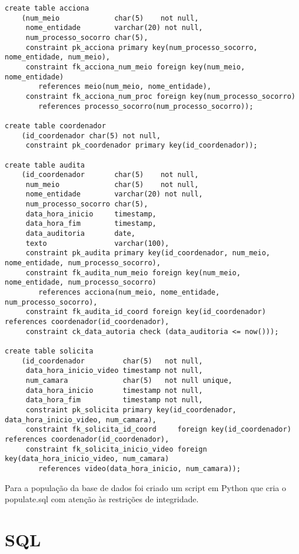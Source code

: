\documentclass[10pt,a4paper]{article}
\begin{document}
\begin{verbatim}
create table acciona
    (num_meio             char(5)    not null,
     nome_entidade        varchar(20) not null,
     num_processo_socorro char(5),
     constraint pk_acciona primary key(num_processo_socorro, nome_entidade, num_meio),
     constraint fk_acciona_num_meio foreign key(num_meio, nome_entidade)
        references meio(num_meio, nome_entidade),
     constraint fk_acciona_num_proc foreign key(num_processo_socorro) 
        references processo_socorro(num_processo_socorro));

create table coordenador
    (id_coordenador char(5) not null,
     constraint pk_coordenador primary key(id_coordenador));

create table audita
    (id_coordenador       char(5)    not null,
     num_meio             char(5)    not null,
     nome_entidade        varchar(20) not null,
     num_processo_socorro char(5),
     data_hora_inicio     timestamp,
     data_hora_fim        timestamp,
     data_auditoria       date,
     texto                varchar(100),
     constraint pk_audita primary key(id_coordenador, num_meio, nome_entidade, num_processo_socorro),
     constraint fk_audita_num_meio foreign key(num_meio, nome_entidade, num_processo_socorro)
        references acciona(num_meio, nome_entidade, num_processo_socorro),
     constraint fk_audita_id_coord foreign key(id_coordenador) references coordenador(id_coordenador),
     constraint ck_data_autoria check (data_auditoria <= now()));

create table solicita
    (id_coordenador         char(5)   not null,
     data_hora_inicio_video timestamp not null,
     num_camara             char(5)   not null unique,
     data_hora_inicio       timestamp not null,
     data_hora_fim          timestamp not null,
     constraint pk_solicita primary key(id_coordenador, data_hora_inicio_video, num_camara),
     constraint fk_solicita_id_coord     foreign key(id_coordenador) references coordenador(id_coordenador),
     constraint fk_solicita_inicio_video foreign key(data_hora_inicio_video, num_camara)
        references video(data_hora_inicio, num_camara));

\end{verbatim}

Para a população da base de dados foi criado um script em Python que cria o populate.sql com atenção às restrições de integridade. 

\section{SQL}
\end{document}
